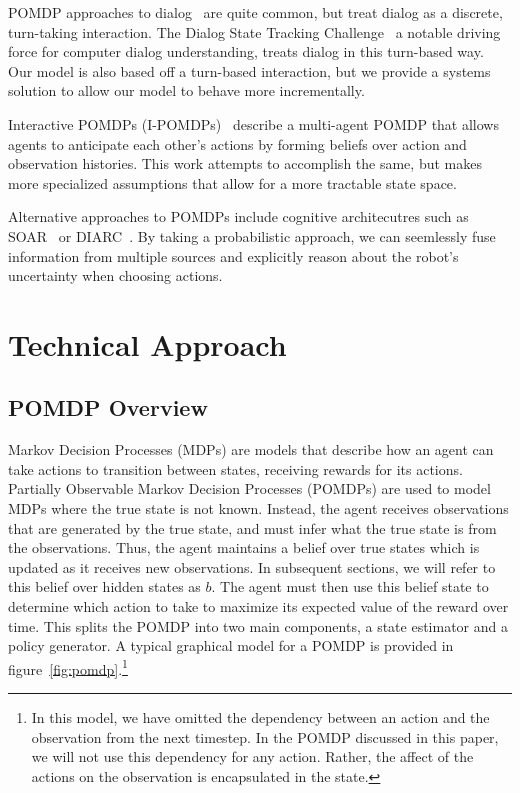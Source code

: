 \documentclass[conference]{IEEEtran}
\begin{document}
POMDP approaches to dialog~\citep{young13} are quite common, but treat dialog
as a discrete, turn-taking interaction. The Dialog State Tracking
Challenge~\citep{williams2013dialog} a notable driving force for computer
dialog understanding, treats dialog in this turn-based way. Our model is also based off a turn-based interaction, but we provide a systems solution to allow our model to behave more incrementally.  

Interactive POMDPs (I-POMDPs)~\citep{gmytrasiewicz2005framework} describe a multi-agent POMDP that allows agents to anticipate each other's actions by forming beliefs over action and observation histories. This work attempts to accomplish the same, but makes more specialized assumptions that allow for a more tractable state space. 

Alternative approaches to
POMDPs include cognitive architecutres such as SOAR~\citep{soar} or
DIARC~\citep{diarc}.  By taking a probabilistic approach, we can seemlessly
fuse information from multiple sources and explicitly reason about the
robot's uncertainty when choosing actions.
\section{Technical Approach}

\subsection{POMDP Overview}

Markov Decision Processes (MDPs) are models that describe how an agent can take actions to transition between states, receiving rewards for its actions. Partially Observable Markov Decision Processes (POMDPs) are used to model MDPs where the true state is not known. Instead, the agent receives observations that are generated by the true state, and must infer what the true state is from the observations. Thus, the agent maintains a belief over true states which is updated as it receives new observations. In subsequent sections, we will refer to this belief over hidden states as $b$. The agent must then use this belief state to determine which action to take to maximize its expected value of the reward over time. This splits the POMDP into two main components, a state estimator and a policy generator. A typical graphical model for a POMDP is provided in figure~\ref{fig:pomdp}.\footnote{In this model, we have omitted the dependency between an action and the observation from the next timestep. In the POMDP discussed in this paper, we will not use this dependency for any action. Rather, the affect of the actions on the observation is encapsulated in the state.}
\end{document}
